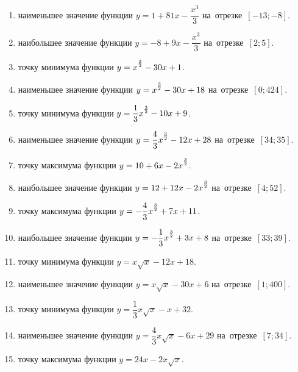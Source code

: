 \documentclass[a4paper,10pt]{article}
\begin{document}
\begin{enumerate}
\item {} наименьшее значение функции $y=1 +81x-\dfrac{x^3}{3}$ на~отрезке~$\left[-13;-8\right]$.

\item {} наибольшее значение функции $y=-8 +9x-\dfrac{x^3}{3}$ на~отрезке~$\left[2;5\right]$.

\item {} точку минимума функции $y=x\strut^{\frac{3}{2}} -30x+1$.

\item {} наименьшее значение функции $y=x\strut^{\frac{3}{2}} -30x+18$ на~отрезке~$\left[0;424\right]$.

\item {} точку минимума функции $y=\dfrac{1}{3}x\strut^{\frac{3}{2}} -10x+9$.

\item {} наименьшее значение функции $y=\dfrac{4}{3}x\strut^{\frac{3}{2}} -12x+28$ на~отрезке~$\left[34;35\right]$.

\item {} точку максимума функции $y=10+6x-2x\strut^{\frac{3}{2}}$.

\item {} наибольшее значение функции $y=12+12x-2x\strut^{\frac{3}{2}}$ на~отрезке~$\left[4;52\right]$.

\item {} точку максимума функции $y=-\dfrac{4}{3}x\strut^{\frac{3}{2}} +7x+11$.

\item {} наибольшее значение функции $y=-\dfrac{1}{3}x\strut^{\frac{3}{2}} +3x+8$ на~отрезке~$\left[33;39\right]$.

\item {} точку минимума функции $y=x\sqrt{x} -12x+18$.

\item {} наименьшее значение функции $y=x\sqrt{x} -30x+6$ на~отрезке~$\left[1;400\right]$.

\item {} точку минимума функции $y=\dfrac{1}{3}x\sqrt{x} -x+32$.

\item {} наименьшее значение функции $y=\dfrac{4}{3}x\sqrt{x} -6x+29$ на~отрезке~$\left[7;34\right]$.

\item {} точку максимума функции $y=24x -2x\sqrt{x}$.


\end{enumerate}
\end{document}
